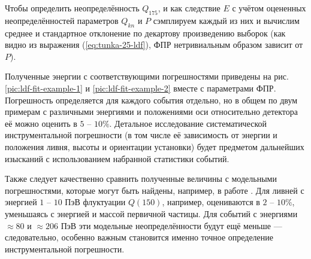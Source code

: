 Чтобы определить неопределённость $Q_{175}$, и как следствие $E$ с учётом оцененных неопределённостей параметров $Q_{kn}$ и $P$ сэмплируем каждый из них и вычислим среднее и стандартное отклонение по декартову произведению выборок (как видно из выражения (\ref{eq:tunka-25-ldf}), ФПР нетривиальным образом зависит от $P$).

Полученные энергии с соответствующими погрешностями приведены на рис. \ref{pic:ldf-fit-example-1} и \ref{pic:ldf-fit-example-2} вместе с параметрами ФПР. Погрешность определяется для каждого события отдельно, но в общем по двум примерам с различными энергиями и положениями оси относительно детектора её можно оценить в $5$ -- $10 \%$. Детальное исследование систематической инструментальной погрешности (в том числе её зависимость от энергии и положения ливня, высоты и ориентации установки) будет предметом дальнейших изысканий с использованием набранной статистики событий.

Также следует качественно сравнить полученные величины с модельными погрешностями, которые могут быть найдены, например, в работе \cite[табл. 1]{Anokhina2007}. Для ливней с энергией $1$ -- $10$ ПэВ флуктуации $Q(150)$, например, оцениваются в $2$ -- $10 \%$, уменьшаясь с энергией и массой первичной частицы. Для событий с энергиями $\approx 80$ и $\approx 206$ ПэВ эти модельные неопределённости будут ещё меньше --- следовательно, особенно важным становится именно точное определение инструментальной погрешности.


